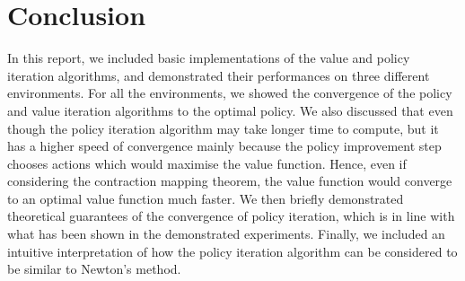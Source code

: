 \documentclass{article}\usepackage[]{graphicx}\usepackage[]{color}
\let\Oldsection\section
\renewcommand{\section}{\FloatBarrier\Oldsection}
\theoremstyle{plain}
\begin{document}
\section{Conclusion}

\noindent
In this report, we included basic implementations of the value and policy iteration algorithms, and demonstrated their performances on three different environments. For all the environments, we showed the convergence of the policy and value iteration algorithms to the optimal policy. We also discussed that even though the policy iteration algorithm may take longer time to compute, but it has a higher speed of convergence mainly because the policy improvement step chooses actions which would maximise the value function. Hence, even if considering the contraction mapping theorem, the value function would converge to an optimal value function much faster. We then briefly demonstrated theoretical guarantees of the convergence of policy iteration, which is in line with what has been shown in the demonstrated experiments. Finally, we included an intuitive interpretation of how the policy iteration algorithm can be considered to be similar to Newton's method. 
\end{document}

